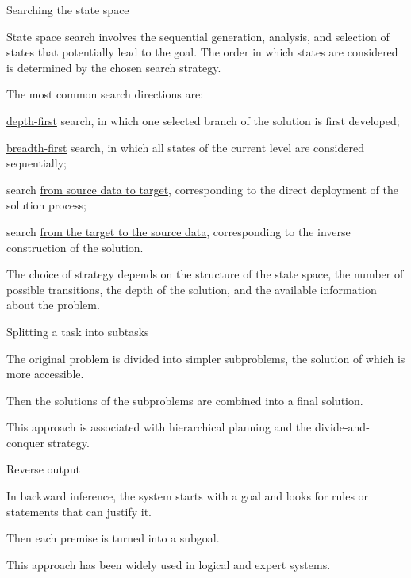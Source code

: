 \begin{frame}{Searching the state space}
	\topline
	\justifying
	
	\footnotesize
	\vspace{10mm}
	
	State space search involves the sequential generation, analysis, and selection of states that potentially lead to the goal. The order in which states are considered is determined by the chosen search strategy.
	
	\vspace{2mm}
	
	The most common search directions are:
	\begin{textitemize}
		\item \uline{depth-first} search, in which one selected branch of the solution is first developed;
		\item \uline{breadth-first} search, in which all states of the current level are considered sequentially;
		\item search \uline{from source data to target}, corresponding to the direct deployment of the solution process;
		\item search \uline{from the target to the source data}, corresponding to the inverse construction of the solution.
	\end{textitemize}
	
	\vspace{2mm}
	
	The choice of strategy depends on the structure of the state space, the number of possible transitions, the depth of the solution, and the available information about the problem.
\end{frame}

\begin{frame}{Splitting a task into subtasks}
	\topline
	\justifying
	
	\begin{textitemize}
		\item The original problem is divided into simpler subproblems, the solution of which is more accessible.
		\item Then the solutions of the subproblems are combined into a final solution.
		\item This approach is associated with hierarchical planning and the divide-and-conquer strategy.
	\end{textitemize}
\end{frame}

\begin{frame}{Reverse output}
	\topline
	\justifying
	
	\begin{textitemize}
		\item In backward inference, the system starts with a goal and looks for rules or statements that can justify it.
		\item Then each premise is turned into a subgoal.
		\item This approach has been widely used in logical and expert systems.
	\end{textitemize}
\end{frame}

